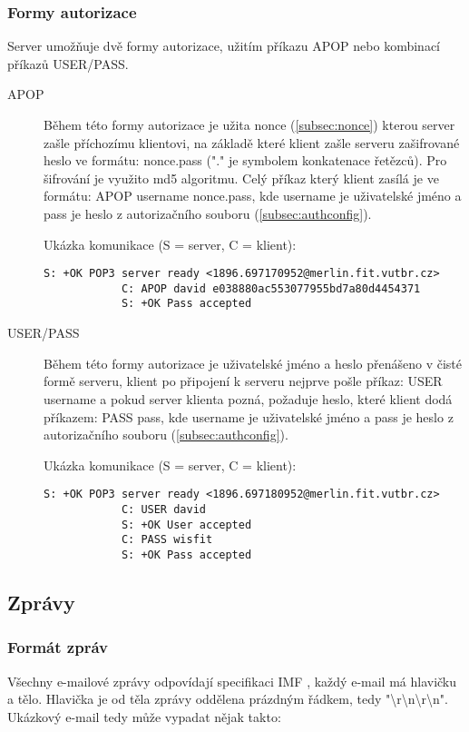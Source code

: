 \documentclass[11pt,a4paper]{report}
\begin{document}
    \subsubsection{Formy autorizace}
    \label{subsec:authmethods}
    Server umožňuje dvě formy autorizace, užitím příkazu APOP nebo kombinací příkazů USER/PASS.
    \begin{description}
        \item [APOP] Během této formy autorizace je užita nonce (\ref{subsec:nonce}) kterou server zašle příchozímu klientovi, na základě které klient zašle serveru zašifrované heslo ve formátu: nonce.pass ("." je symbolem konkatenace řetězců). Pro šifrování je využito md5 algoritmu. Celý příkaz který klient zasílá je ve formátu: APOP username nonce.pass, kde username je uživatelské jméno a pass je heslo z autorizačního souboru (\ref{subsec:authconfig}).\par
        Ukázka komunikace (S = server, C = klient):
        \begin{lstlisting}[frame=trBL]
            S: +OK POP3 server ready <1896.697170952@merlin.fit.vutbr.cz>
            C: APOP david e038880ac553077955bd7a80d4454371
            S: +OK Pass accepted
        \end{lstlisting}\par
        \item [USER/PASS] Během této formy autorizace je uživatelské jméno a heslo přenášeno v čisté formě serveru, klient po připojení k serveru nejprve pošle příkaz: USER username a pokud server klienta pozná, požaduje heslo, které klient dodá příkazem: PASS pass, kde username je uživatelské jméno a pass je heslo z autorizačního souboru (\ref{subsec:authconfig}).\par
        Ukázka komunikace (S = server, C = klient):
        \begin{lstlisting}[frame=trBL]
            S: +OK POP3 server ready <1896.697180952@merlin.fit.vutbr.cz>
            C: USER david
            S: +OK User accepted
            C: PASS wisfit
            S: +OK Pass accepted
        \end{lstlisting}
    \end{description}

    \subsection{Zprávy}
    \label{subsec:mails}
    \subsubsection{Formát zpráv}
    \label{subsec:mailformat}
    Všechny e-mailové zprávy odpovídají specifikaci IMF \cite{IMF}, každý e-mail má hlavičku a tělo. Hlavička je od těla zprávy oddělena prázdným řádkem, tedy "\textbackslash r\textbackslash n\textbackslash r\textbackslash n". Ukázkový e-mail tedy může vypadat nějak takto:
\end{document}

